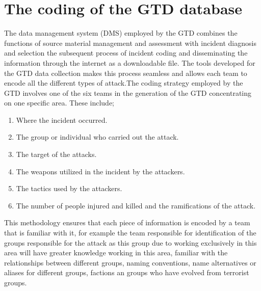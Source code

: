 \section{The coding of the GTD database}
The data management system (DMS) employed by the GTD combines the functions of source material management and assessment with incident diagnosis and selection the subsequent process of incident coding and disseminating the information through the internet as a downloadable file. The tools developed for the GTD data collection makes this process seamless and allows each team to encode all the different types of attack.The coding strategy employed by the GTD involves one of the six teams in the generation of the GTD concentrating on one specific area. These include;
\begin{enumerate}
 \item Where the incident occurred.
 \item  The group or individual who carried out the attack.
 \item The target of the attacks.
 \item The weapons utilized in the incident by the attackers.
 \item The tactics used by the attackers.
 \item The number of people injured and killed and the ramifications of the attack.
 \end{enumerate} 
This methodology ensures that each piece of information is encoded by a team that is familiar with it, for example the team responsible for identification of the groups responsible for the attack  as this group due to working exclusively in this area will have greater knowledge working in this area, familiar with the relationships between different groups, naming conventions, name alternatives or aliases for different groups, factions an groups who have evolved from terrorist groups.
